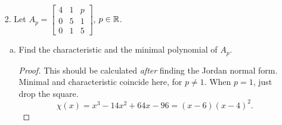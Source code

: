 \begin{itemize}
\begin{enumerate}[(a)]
\begin{proof}
    This is clearly not invertible. Another way to see this is that all constants get sent to 0, so of course it's not an isomorphism.
    \end{proof}
    
    \item Prove or disprove: $D$ is diagonalizable.
    \begin{proof}
    A matrix is diagonalizable if it has $n$ distinct eigenvalues; so if it has $n$ repeated eigenvalues then it is not diagonalizable. The eigenvalues for $D$ will be all $0$'s, so not diagonalizable. 
    \end{proof}
    
    \item Compute $D^*(a_0 + a_1 x + a_2 x^2 + ... + a_{d-1} x^{d-1})$ where $D^* : V \rar V$ is the adjoint of $D$.
    \begin{proof}
        Since we know the matrix representation of $D$, its adjoint $D^*$ will be the transpose. If you are more analytically minded, consider the integration by parts:
        $$\ip{Dp}{q} = \Big( p(1)q(1) - p(0)q(0) \Big) - \ip{p}{Dq}.$$
    \end{proof}
\end{enumerate}







\item[2.] Let $A_p = \begin{bmatrix}
4 & 1 & p \\
0 & 5 & 1 \\
0 & 1 & 5
\end{bmatrix}$, $p \in \mathbb{R}$.
\begin{enumerate}[(a)]
    \item Find the characteristic and the minimal polynomial of $A_p$.
    \begin{proof} This should be calculated \textit{after} finding the Jordan normal form. Minimal and characteristic coincide here, for $p \neq 1$. When $p=1$, just drop the square.
    \[\chi(x) = x^3 - 14x^2 + 64x - 96 = (x-6)(x-4)^2.\]
    \end{proof}
    

\end{enumerate}
\end{itemize}
